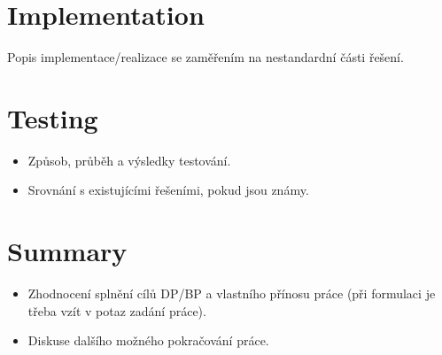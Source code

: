 \documentclass[11pt,twoside,a4paper]{book}
\begin{document}
\chapter{Implementation}
Popis implementace/realizace se zaměřením na nestandardní části řešení.


\chapter{Testing}

\begin{itemize}
 \item Způsob, průběh a výsledky testování.
 \item Srovnání s existujícími řešeními, pokud jsou známy.
\end{itemize} 


\chapter{Summary}

\begin{itemize}
\item Zhodnocení splnění cílů DP/BP a  vlastního přínosu práce (při formulaci je třeba vzít v potaz zadání práce).
\item Diskuse dalšího možného pokračování práce.
\end{itemize} 


%



\end{document}
